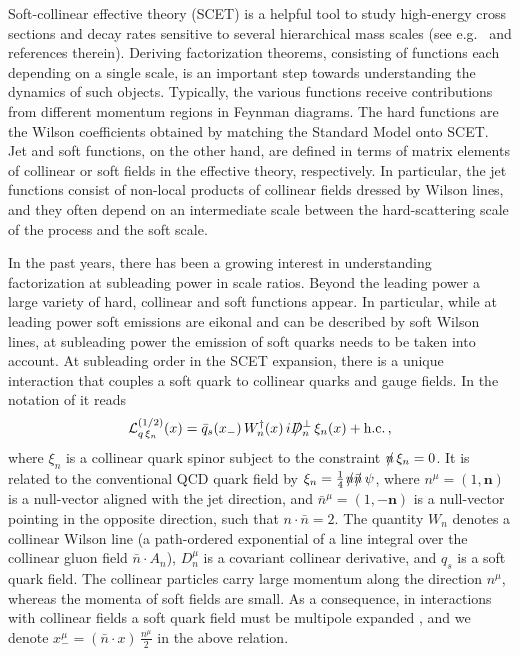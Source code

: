 \documentclass[12pt]{article}
\newcommand{\nsl}{\rlap{\hspace{0.25mm}/}{n}}
\newcommand{\nbsl}{\rlap{\hspace{0.25mm}/}{\bar n}}
\newcommand{\Dsl}{\rlap{\hspace{0.75mm}/}{D}}
\newcommand{\spac}{{\hspace{0.3mm}}}
\numberwithin{equation}{section}
\begin{document}
Soft-collinear effective theory (SCET) is a helpful tool to study high-energy cross sections and decay rates sensitive to several hierarchical mass scales (see e.g.\ \cite{Bauer:2002nz} and references therein). Deriving factorization theorems, consisting of functions each depending on a single scale, is an important step towards understanding the dynamics of such objects. Typically, the various functions receive contributions from different momentum regions in Feynman diagrams. The hard functions are the Wilson coefficients obtained by matching the Standard Model onto SCET. Jet and soft functions, on the other hand, are defined in terms of matrix elements of collinear or soft fields in the effective theory, respectively. In particular, the jet functions consist of non-local products of collinear fields dressed by Wilson lines, and they often depend on an intermediate scale between the hard-scattering scale of the process and the soft scale.

In the past years, there has been a growing interest in understanding factorization at subleading power in scale ratios. Beyond the leading power a large variety of hard, collinear and soft functions appear. In particular, while at leading power soft emissions are eikonal and can be described by soft Wilson lines, at subleading power the emission of soft quarks needs to be taken into account. At subleading order in the SCET expansion, there is a unique interaction that couples a soft quark to collinear quarks and gauge fields. In the notation of \cite{Beneke:2002ph} it reads 
\begin{equation}\label{subleadingL}
   {\cal L}_{q\,\xi_n}^{(1/2)}(x)
   = \bar q_s(x_-)\,W_n^\dagger(x)\,i\Dsl_n^\perp\,\xi_n(x) + \mbox{h.c.} \,, 
\end{equation}
where $\xi_n$ is a collinear quark spinor subject to the constraint $\nsl\,\xi_n=0$. It is related to the conventional QCD quark field by $\xi_n=\frac14\spac\nsl\nbsl\,\psi$, where $n^\mu=(1,\bm{n})$ is a null-vector aligned with the jet direction, and $\bar n^\mu=(1,-\bm{n})$ is a null-vector pointing in the opposite direction, such that $n\cdot\bar n=2$. The quantity $W_n$ denotes a collinear Wilson line (a path-ordered exponential of a line integral over the collinear gluon field $\bar n\cdot A_n$), $D_n^\mu$ is a covariant collinear derivative, and $q_s$ is a soft quark field. The collinear particles carry large momentum along the direction $n^\mu$, whereas the momenta of soft fields are small. As a consequence, in interactions with collinear fields a soft quark field must be multipole expanded \cite{Beneke:2002ph}, and we denote $x_-^\mu=(\bar n\cdot x)\,\frac{n^\mu}{2}$ in the above relation.
\end{document}

